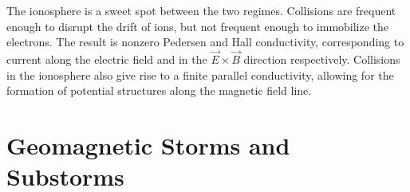 The ionosphere is a sweet spot between the two regimes. Collisions are frequent enough to disrupt the drift of ions, but not frequent enough to immobilize the electrons. The result is nonzero Pedersen and Hall conductivity, corresponding to current along the electric field and in the $\vec{E} \times \vec{B}$ direction respectively. Collisions in the ionosphere also give rise to a finite parallel conductivity, allowing for the formation of potential structures along the magnetic field line. 










\section{Geomagnetic Storms and Substorms}
  \label{sec_storms}

